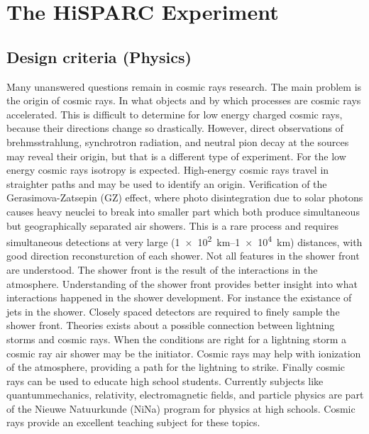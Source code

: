 \chapter{The HiSPARC Experiment}

\section{Design criteria (Physics)}

Many unanswered questions remain in cosmic rays research. The main problem is the origin of cosmic rays. In what objects and by which processes are cosmic rays accelerated. This is difficult to determine for low energy charged cosmic rays, because their directions change so drastically. However, direct observations of brehmsstrahlung, synchrotron radiation, and neutral pion decay at the sources may reveal their origin, but that is a different type of experiment. For the low energy cosmic rays isotropy is expected. High-energy cosmic rays travel in straighter paths and may be used to identify an origin. Verification of the  Gerasimova-Zatsepin (GZ) effect, where photo disintegration due to solar photons causes heavy neuclei to break into smaller part which both produce simultaneous but geographically separated air showers. This is a rare process and requires simultaneous detections at very large (\SIrange{1e2}{1e4}{\kilo\meter}) distances, with good direction reconsturction of each shower. Not all features in the shower front are understood. The shower front is the result of the interactions in the atmosphere. Understanding of the shower front provides better insight into what interactions happened in the shower development. For instance the existance of jets in the shower. Closely spaced detectors are required to finely sample the shower front. Theories exists about a possible connection between lightning storms and cosmic rays. When the conditions are right for a lightning storm a cosmic ray air shower may be the initiator. Cosmic rays may help with ionization of the atmosphere, providing a path for the lightning to strike. Finally cosmic rays can be used to educate high school students. Currently subjects like quantummechanics, relativity, electromagnetic fields, and particle physics are part of the Nieuwe Natuurkunde (NiNa) program for physics at high schools. Cosmic rays provide an excellent teaching subject for these topics.

